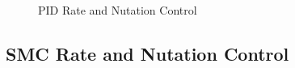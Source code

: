 \begin{figure}[H]
  \centerline{}
  \caption{PID Rate and Nutation Control}
  \label{fig:PIDNutationRateControl}
\end{figure}

\subsection{SMC Rate and Nutation Control}
\label{subsec:SMC}


